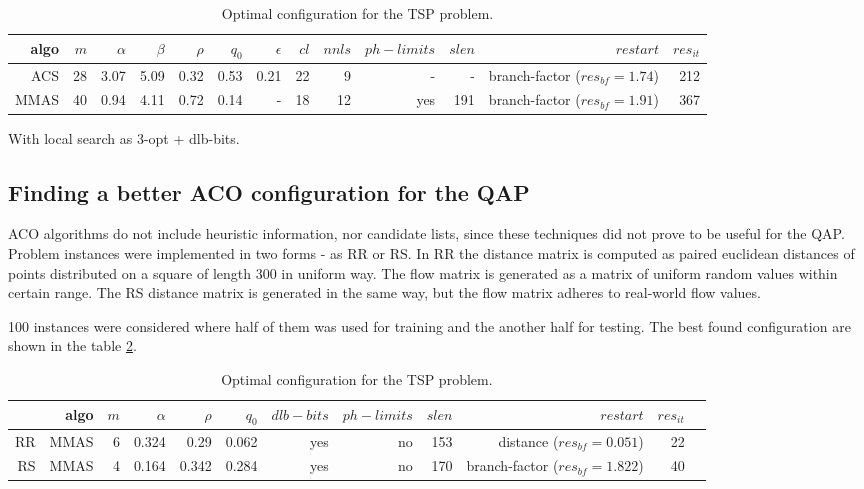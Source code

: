\documentclass[12pt]{article}
\begin{document}
\begin{table}[ht]
\centering
\resizebox{\textwidth}{!}
{
\begin{tabular}{|r|r|r|r|r|r|r|r|r|r|r|r|r|}
  \hline 
    algo & $m$ & $\alpha$ & $\beta$ & $\rho$ & $q_0$ & $\epsilon$ & $cl$ & $nnls$ & $ph-limits$ & $slen$ & $restart$ & $res_{it}$\\ \hline
    ACS & 28 & 3.07 & 5.09 & 0.32 & 0.53 & 0.21 & 22 & 9 & - & - & branch-factor ($res_{bf} = 1.74$) & 212\\ \hline
	MMAS & 40 & 0.94 & 4.11 & 0.72 & 0.14 & - & 18 & 12 & yes & 191 & branch-factor ($res_{bf} = 1.91$) & 367\\ \hline
\end{tabular}
}
\caption{Optimal configuration for the TSP problem.}
\label{table:table-tsp} 
\end{table} 

With local search as 3-opt + dlb-bits.

\subsection{Finding a better ACO configuration for the QAP}

ACO algorithms do not include heuristic information, nor candidate lists, since these techniques did not prove to be useful for the QAP. Problem instances were implemented in two forms - as RR or RS. In RR the distance matrix is computed as paired euclidean distances of points distributed on a square of length 300 in uniform way. The flow matrix is generated as a matrix of uniform random values within certain range. The RS distance matrix is generated in the same way, but the flow matrix adheres to real-world flow values.

100 instances were considered where half of them was used for training and the another half for testing. The best found configuration are shown in the table \ref{table:table-qap}.

\begin{table}[ht]
\centering
\resizebox{\textwidth}{!}
{
\begin{tabular}{|r|r|r|r|r|r|r|r|r|r|r|r|}
  \hline 
    & algo & $m$ & $\alpha$ & $\rho$ & $q_0$ & $dlb-bits$ & $ph-limits$ & $slen$ & $restart$ & $res_{it}$\\ \hline
    RR & MMAS & 6 & 0.324 & 0.29 & 0.062 & yes & no & 153 & distance ($res_{bf} = 0.051$) & 22\\ \hline
	RS & MMAS & 4 & 0.164 & 0.342 & 0.284 & yes & no & 170 & branch-factor ($res_{bf} = 1.822$) & 40\\ \hline
\end{tabular}
}
\caption{Optimal configuration for the TSP problem.}
\label{table:table-qap} 
\end{table} 
\end{document}
